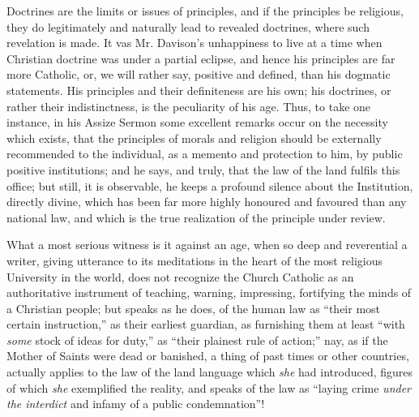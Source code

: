 Doctrines are the limits or issues of principles,
and if the principles be religious, they do legitimately and naturally
lead to revealed doctrines, where such revelation is made. It vas Mr.
Davison's unhappiness to live at a time when Christian doctrine was
under a partial eclipse, and hence his principles are far more
Catholic, or, we will rather say, positive and defined, than his
dogmatic statements. His principles and their definiteness are his
own; his doctrines, or rather their indistinctness, is the peculiarity
of his age. Thus, to take one instance, in his Assize Sermon some
excellent remarks occur on the necessity which exists, that the
principles of morals and religion should be externally recommended to
the individual, as a memento and protection to him, by public positive
institutions; and he says, and truly, that the law of the land fulfils
this office; but still, it is observable, he keeps a profound silence
about the Institution, directly divine, which has been far more highly
honoured and favoured than any national law, and which is the true
realization of the principle under review.

What a most serious witness is it against an age,
when so deep and reverential a writer, giving utterance to its
meditations in the heart of the most religious University in the
world, does not recognize the Church Catholic as an authoritative
instrument of teaching, warning, impressing, fortifying the minds of a
Christian people; but speaks as he does, of the human law as ``their
most certain instruction,'' as their earliest guardian, as furnishing
them at least ``with \emph{some} stock of ideas for duty,'' as ``their
plainest rule of action;'' nay, as if the Mother of Saints were dead or
banished, a thing of past times or other countries, actually applies
to the law of the land language which \emph{she} had introduced,
figures of which \emph{she} exemplified the reality, and speaks of the
law as ``laying crime \emph{under the interdict} and infamy of a public
condemnation''!

